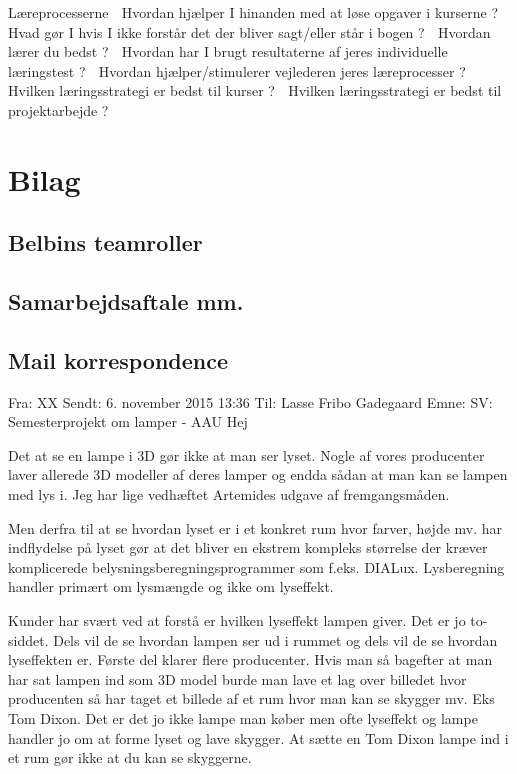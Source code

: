 \documentclass[oneside,a4paper,titlepage]{article}
\begin{document}
Læreprocesserne
 Hvordan hjælper I hinanden med at løse opgaver i kurserne ?
 Hvad gør I hvis I ikke forstår det der bliver sagt/eller står i bogen ?
 Hvordan lærer du bedst ?
 Hvordan har I brugt resultaterne af jeres individuelle læringstest ?
 Hvordan hjælper/stimulerer vejlederen jeres læreprocesser ?
 Hvilken læringsstrategi er bedst til kurser ?
 Hvilken læringsstrategi er bedst til projektarbejde ?



\section{Bilag}

\subsection{Belbins teamroller}
\label{sec:styr_paa_projektet}


\subsection{Samarbejdsaftale mm.}
\label{sec:samarbejdsaftale}


\subsection{Mail korrespondence}
Fra: XX \newline
Sendt: 6. november 2015 13:36 \newline
Til: Lasse Fribo Gadegaard\newline
Emne: SV: Semesterprojekt om lamper - AAU\newline
Hej
 
Det at se en lampe i 3D gør ikke at man ser lyset. Nogle af vores producenter laver allerede 3D modeller af deres lamper og endda sådan at man kan se lampen med lys i. Jeg har lige vedhæftet Artemides udgave af fremgangsmåden.

Men derfra til at se hvordan lyset er i et konkret rum hvor farver, højde mv. har indflydelse på lyset gør at det bliver en ekstrem kompleks størrelse der kræver komplicerede belysningsberegningsprogrammer som f.eks. DIALux. Lysberegning handler primært om lysmængde og ikke om lyseffekt.

Kunder har svært ved at forstå er hvilken lyseffekt lampen giver. Det er jo to-siddet. Dels vil de se hvordan lampen ser ud i rummet og dels vil de se hvordan lyseffekten er. Første del klarer flere producenter. Hvis man så bagefter at man har sat lampen ind som 3D model burde man lave et lag over billedet hvor producenten så har taget et billede af et rum hvor man kan se skygger mv. Eks Tom Dixon. Det er det jo ikke lampe man køber men ofte lyseffekt og lampe handler jo om at forme lyset og lave skygger. At sætte en Tom Dixon lampe ind i et rum gør ikke at du kan se skyggerne.
\end{document}
